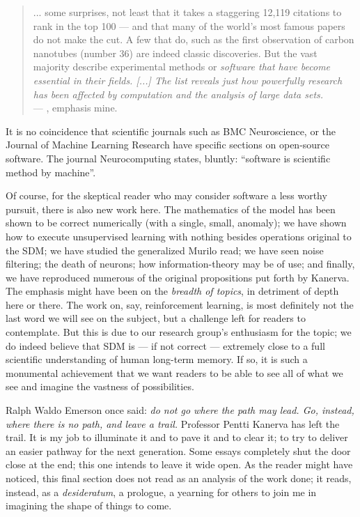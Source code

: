 \begin{quote}
... some surprises, not least that it takes a staggering 12,119 citations to rank in the top 100 — and that many of the world’s most famous papers do not make the cut. A few that do, such as the first observation of carbon nanotubes (number 36) are indeed classic discoveries. But the vast majority describe experimental methods or \emph{software that have become essential in their fields. [...] The list reveals just how powerfully research has been affected by computation and the analysis of large data sets.} \\
\hfill --- \citet{van2014top}, emphasis mine.
\end{quote}

It is no coincidence that scientific journals such as BMC Neuroscience, or the Journal of Machine Learning Research have specific sections on open-source software. The journal Neurocomputing states, bluntly: “software is scientific method by machine”.

Of course, for the skeptical reader who may consider software a less worthy pursuit, there is also new work here.  The mathematics of the model has been shown to be correct numerically (with a single, small, anomaly); we have shown how to execute unsupervised learning with nothing besides operations original to the SDM; we have studied the generalized Murilo read; we have seen noise filtering; the death of neurons; how information-theory may be of use; and finally, we have reproduced numerous of the original propositions put forth by Kanerva.  The emphasis might have been on the \emph{breadth of topics}, in detriment of depth here or there.  The work on, say, reinforcement learning, is most definitely not the last word we will see on the subject, but a challenge left for readers to contemplate. But this is due to our research group's enthusiasm for the topic; we do indeed believe that SDM is --- if not correct --- extremely close to a full scientific understanding of human long-term memory.  If so, it is such a monumental achievement that we want readers to be able to see all of what we see and imagine the vastness of possibilities.

Ralph Waldo Emerson once said: \emph{do not go where the path may lead. Go, instead, where there is no path, and leave a trail.}  Professor Pentti Kanerva has left the trail.  It is my job to illuminate it and to pave it and to clear it; to try to deliver an easier pathway for the next generation.  Some essays completely shut the door close at the end; this one intends to leave it wide open. As the reader might have noticed, this final section does not read as an analysis of the work done; it reads, instead, as a \emph{desideratum}, a prologue, a yearning for others to join me in imagining the shape of things to come.











